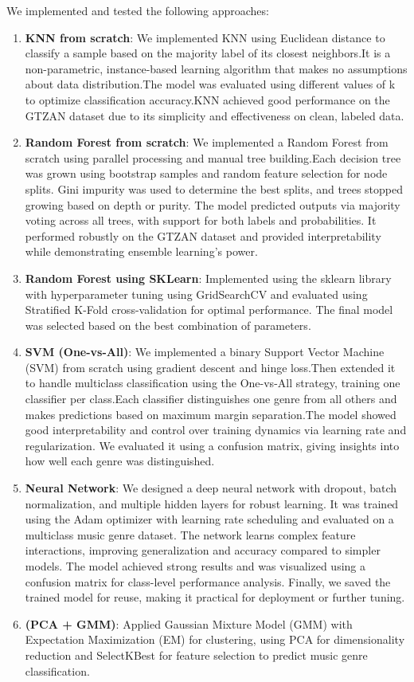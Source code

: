 \documentclass[a4paper]{article}
\theoremstyle{plain}
\theoremstyle{definition}
\begin{document}
We implemented and tested the following approaches:

\begin{enumerate}
    \item \textbf{KNN from scratch}: We implemented KNN using Euclidean distance to classify a sample based on the majority label of its closest neighbors.It is a non-parametric, instance-based learning algorithm that makes no assumptions about data distribution.The model was evaluated using different values of k to optimize classification accuracy.KNN achieved good performance on the GTZAN dataset due to its simplicity and effectiveness on clean, labeled data.
    \item \textbf{Random Forest from scratch}: We implemented a Random Forest from scratch using parallel processing and manual tree building.Each decision tree was grown using bootstrap samples and random feature selection for node splits. Gini impurity was used to determine the best splits, and trees stopped growing based on depth or purity. The model predicted outputs via majority voting across all trees, with support for both labels and probabilities. It performed robustly on the GTZAN dataset and provided interpretability while demonstrating ensemble learning's power.
    \item \textbf{Random Forest using SKLearn}: Implemented using the sklearn library with hyperparameter tuning using GridSearchCV and evaluated using Stratified K-Fold cross-validation for optimal performance. The final model was selected based on the best combination of parameters.
    \item \textbf{SVM (One-vs-All)}: We implemented a binary Support Vector Machine (SVM) from scratch using gradient descent and hinge loss.Then extended it to handle multiclass classification using the One-vs-All strategy, training one classifier per class.Each classifier distinguishes one genre from all others and makes predictions based on maximum margin separation.The model showed good interpretability and control over training dynamics via learning rate and regularization. We evaluated it using a confusion matrix, giving insights into how well each genre was distinguished.
    \item \textbf{Neural Network}: We designed a deep neural network with dropout, batch normalization, and multiple hidden layers for robust learning. It was trained using the Adam optimizer with learning rate scheduling and evaluated on a multiclass music genre dataset. The network learns complex feature interactions, improving generalization and accuracy compared to simpler models. The model achieved strong results and was visualized using a confusion matrix for class-level performance analysis. Finally, we saved the trained model for reuse, making it practical for deployment or further tuning.
    \item \textbf{(PCA + GMM)}: Applied Gaussian Mixture Model (GMM) with Expectation Maximization (EM) for clustering, using PCA for dimensionality reduction and SelectKBest for feature selection to predict music genre classification.
\end{enumerate}
\end{document}
